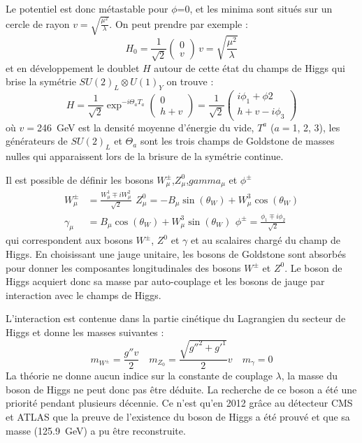 Le potentiel est donc métastable pour $\phi$=0, et les minima sont situés sur un cercle de rayon $v=\sqrt{\frac{\mu^{2}}{\lambda}}$. On peut prendre par exemple :
\begin{equation}
H_{0}=\frac{1}{\sqrt{2}}\begin{pmatrix} 
0\\
v
\end{pmatrix} \, v=\sqrt{\frac{\mu^{2}}{\lambda}}
\end{equation}
et en développement le doublet $H$ autour de cette état du champs de Higgs qui brise la symétrie $SU(2)_{L}\otimes U(1)_{Y}$ on trouve : 
\begin{equation}
H=\frac{1}{\sqrt{2}}\exp^{-i\Theta_{a}T_{a}}\begin{pmatrix} 
0\\
h+v
\end{pmatrix}=\frac{1}{\sqrt{2}}\begin{pmatrix} 
i\phi_{1}+\phi{2}\\
h+v-i\phi_{3}
\end{pmatrix}
\end{equation}
où $v=$\SI{246}{\giga\eV} est la densité moyenne d'énergie du vide, $T^{a}$ ($a=$\num{1}, \num{2}, \num{3}), les générateurs de $SU(2)_{L}$ et $\Theta_{a}$ sont les trois champs de Goldstone de masses nulles qui apparaissent lors de la brisure de la symétrie continue.

Il est possible de définir les bosons $W_{\mu}^{\pm}$,$Z_{\mu}^{0}$,$gamma_{\mu}$ et $\phi^{\pm}$ 
\begin{equation}
\begin{split}
W_{\mu}^{\pm}&=\frac{W_{\mu}^{1}\mp iW_{\mu}^{2}}{\sqrt{2}}\, \ Z_{\mu}^{0}=-B_{\mu}\sin(\theta_{W})+W_{\mu}^{3}\cos(\theta_{W})\\
\gamma_{\mu}&=B_{\mu}\cos(\theta_{W})+W_{\mu}^{3}\sin(\theta_{W})\, \ \phi^{\pm}=\frac{\phi_{1}\mp i\phi_{2}}{\sqrt{2}}
\end{split}
\end{equation}
qui correspondent aux bosons $W^{\pm}$, $Z^{0}$ et $\gamma$ et au scalaires chargé du champ de Higgs. En choisissant une jauge unitaire, les bosons de Goldstone sont absorbés pour donner les composantes longitudinales des bosons $W^{\pm}$ et $Z^{0}$. Le boson de Higgs acquiert donc sa masse par auto-couplage et les bosons de jauge par interaction avec le champs de Higgs.

L'interaction est contenue dans la partie cinétique du Lagrangien du secteur de Higgs et donne les masses suivantes : 
\begin{equation}
m_{W^{\pm}}=\frac{g''v}{2} \quad m_{Z_{0}}=\frac{\sqrt{g''^{2}+g'^{1}}}{2}v \quad m_{\gamma}=0 
\end{equation} 
La théorie ne donne aucun indice sur la constante de couplage $\lambda$, la masse du boson de Higgs ne peut donc pas être déduite. La recherche de ce boson a été une priorité pendant plusieurs décennie. Ce n'est qu'en \num{2012} grâce au détecteur CMS et ATLAS que la preuve de l'existence du boson de Higgs a été prouvé et que sa masse (\SI{125.9}{\giga\eV}) a pu être reconstruite. 

